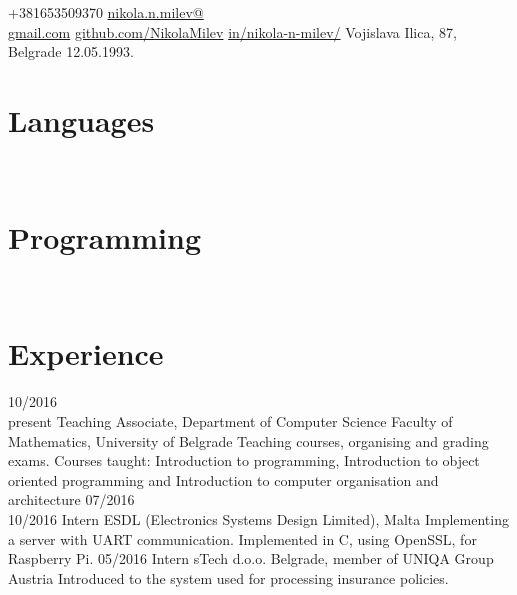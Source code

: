 \documentclass{my_cv}
\begin{document}
	{+381653509370}
 	{\href{mailto:nikola.n.milev@gmail.com}{nikola.n.milev@\\gmail.com}}
	{ \href{https://github.com/NikolaMilev}{github.com/NikolaMilev}} 	
 	{ \href{https://www.linkedin.com/in/nikola-n-milev/}{in/nikola-n-milev/}}
	{ Vojislava Ilica, 87, Belgrade }
	{12.05.1993.}


 
\begin{aside}
\section{Languages}
\bodyfont{}
~
~
\section{Programming}
~
\end {aside} 

\section{Experience}
\begin{entrylist}
\entry
    {10/2016~\textemdash \\present}
    {Teaching Associate, Department of Computer Science}
    {Faculty of Mathematics, University of Belgrade}
    {Teaching courses, organising and grading exams. Courses taught: Introduction to programming, Introduction to object oriented programming and Introduction to computer organisation and architecture}
\entry
    {07/2016~\textemdash \\10/2016}
    {Intern}
    {ESDL (Electronics Systems Design Limited), Malta}
    {Implementing a server with UART communication. Implemented in C, using OpenSSL, for Raspberry Pi.}
\entry
    {05/2016}
    {Intern}
    {sTech d.o.o. Belgrade, member of UNIQA Group Austria}
    {Introduced to the system used for processing insurance policies.}
\end{entrylist}
\end{document}
